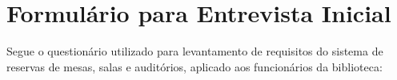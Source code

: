 \chapter{Formulário para Entrevista Inicial}\label{apendice:entrevistas}

Segue o questionário utilizado para levantamento de requisitos do sistema de reservas de mesas, salas e auditórios, aplicado aos funcionários da biblioteca:


